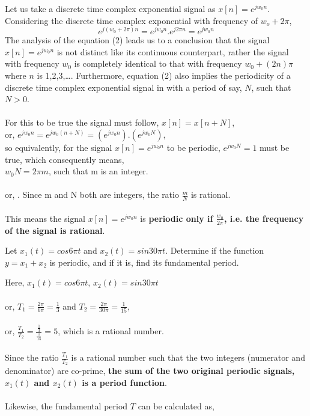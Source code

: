 \documentclass{article}[12 pt]
\begin{document}
\begin{solution}
{Let us take a discrete time complex exponential signal as $x[n]=e^{jw_0n}$. Considering the discrete time complex exponential with frequency of $w_o + 2\pi$,\\\begin{equation}
    e^{j(w_0+2\pi)n}= e^{jw_0n}.e^{j2\pi n} =e^{jw_0n}
\end{equation}
The analysis of the equation (2) leads us to a conclusion that the signal $x[n]=e^{jw_0n}$ is not distinct like its continuous counterpart, rather the signal with frequency $w_0$ is completely identical to that with frequency $w_0+(2n)\pi$ where $n$ is 1,2,3,\dots. Furthermore, equation (2) also implies the periodicity of a discrete time complex exponential signal in with a period of say, $N$, such that $N>0$.\\\\ For this to be true the signal must follow, $x[n]=x[n+N]$,\\or, $e^{jw_0n}=e^{jw_0(n+N)}=(e^{jw_0n}).(e^{jw_0N})$,\\ so equivalently, for the signal $x[n]=e^{jw_0n}$ to be periodic, $e^{jw_0N}=1$ must be true, which consequently means,\\
    $w_0N=2\pi m$, such that m is an integer.\\\\or,
    . Since m and N both are integers, the ratio $\frac{m}{N}$ is rational.\\\\This means the signal $x[n]=e^{jw_0n}$ is \textbf{periodic only if $\frac{w_0}{2\pi}$, i.e. the frequency of the signal is rational}.}
\end{solution}


\begin{problem}
{Let $x_1(t)=cos6\pi t$ and $x_2(t)=sin30\pi t$. Determine if the function $y=x_1+x_2 $ is periodic, and if it is, find its fundamental period.}
\end{problem}
\begin{solution}
{Here, $x_1(t)=cos6\pi t $, $ x_2(t)=sin30\pi t$ \\\\
     or, $T_1 = \frac{2\pi}{6\pi}=\frac{1}{3}$ and $T_2 = \frac{2\pi}{30\pi} = \frac{1}{15}$,\\\\
     or, $\frac{T_1}{T_2}=\frac{\frac{1}{3}}{\frac{1}{15}}=5$,
    which is a rational number. \\\\Since the ratio $\frac{T_1}{T_2}$ is a rational number such that the two integers (numerator and denominator) are co-prime, \textbf{the sum of the two original periodic signals, $x_1(t)$ and $x_2(t)$ is a period function}.\\\\ Likewise, the fundamental period $T$ can be calculated as,\\
    }
\end{solution}
\end{document}
